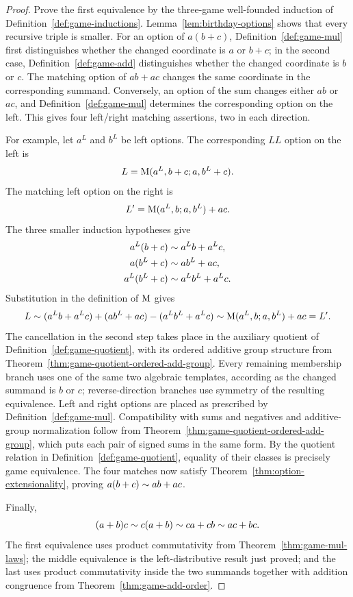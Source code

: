 \begin{proof}
  \leanok
  Prove the first equivalence by the three-game well-founded induction of
  Definition~\ref{def:game-inductions}.  Lemma~\ref{lem:birthday-options}
  shows that every recursive triple is smaller.  For an option of
  \(a(b+c)\), Definition~\ref{def:game-mul} first distinguishes whether the
  changed coordinate is \(a\) or \(b+c\); in the second case,
  Definition~\ref{def:game-add} distinguishes whether the changed coordinate
  is \(b\) or \(c\).  The matching option of \(ab+ac\) changes the same
  coordinate in the corresponding summand.  Conversely, an option of the sum
  changes either \(ab\) or \(ac\), and Definition~\ref{def:game-mul}
  determines the corresponding option on the left.  This gives four
  left/right matching assertions, two in each direction.

  For example, let \(a^L\) and \(b^L\) be left options.  The corresponding
  \(LL\) option on the left is
  \[
    L=\operatorname{M}(a^L,b+c;a,b^L+c).
  \]
  The matching left option on the right is
  \[
    L'=\operatorname{M}(a^L,b;a,b^L)+ac.
  \]
  The three smaller induction hypotheses give
  \[
    \begin{aligned}
      a^L(b+c)&\sim a^Lb+a^Lc,\\
      a(b^L+c)&\sim ab^L+ac,\\
      a^L(b^L+c)&\sim a^Lb^L+a^Lc.
    \end{aligned}
  \]
  Substitution in the definition of \(\operatorname{M}\) gives
  \[
    L\sim
      (a^Lb+a^Lc)+(ab^L+ac)-(a^Lb^L+a^Lc)
      \sim \operatorname{M}(a^L,b;a,b^L)+ac=L'.
  \]
  The cancellation in the second step takes place in the auxiliary quotient of
  Definition~\ref{def:game-quotient}, with its ordered additive group structure from
  Theorem~\ref{thm:game-quotient-ordered-add-group}.  Every remaining
  membership branch uses one of the same two algebraic templates, according
  as the changed summand is \(b\) or \(c\); reverse-direction branches use
  symmetry of the resulting equivalence.  Left and right options are placed
  as prescribed by Definition~\ref{def:game-mul}.  Compatibility with sums and negatives
  and additive-group normalization follow from
  Theorem~\ref{thm:game-quotient-ordered-add-group}, which puts each pair of signed sums
  in the same form.  By the
  quotient relation in
  Definition~\ref{def:game-quotient}, equality of their classes is precisely
  game equivalence.  The four matches now satisfy
  Theorem~\ref{thm:option-extensionality}, proving
  \(a(b+c)\sim ab+ac\).

  Finally,
  \[
    (a+b)c\sim c(a+b)\sim ca+cb\sim ac+bc.
  \]
  The first equivalence uses product commutativity from
  Theorem~\ref{thm:game-mul-laws}; the middle equivalence is the
  left-distributive result just proved; and the last uses product
  commutativity inside the two summands together with addition congruence from
  Theorem~\ref{thm:game-add-order}.
\end{proof}

